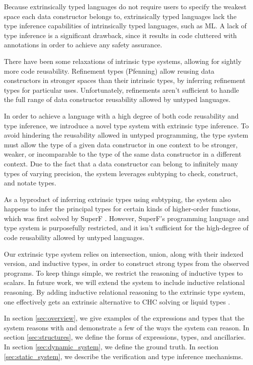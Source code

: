 \documentclass[acmsmall]{acmart}
\theoremstyle{definition}
\begin{document}
Because extrinsically typed languages do not require users to specify the weakest space each data constructor belongs to,
extrinsically typed languages lack the type inference capabilities of intrinsically typed languages, such as ML. 
A lack of type inference is a significant drawback, since it results in code cluttered with annotations in order
to achieve any safety assurance.

There have been some relaxations of intrinsic type systems, allowing for sightly more code reusability.
Refinement types (Pfenning) \cite{} allow reusing data constructors in stronger spaces than their intrinsic types, by
inferring refinement types for particular uses.
Unfortunately, refinements aren't sufficient to handle the full range of data constructor reusability allowed by untyped languages.

In order to achieve a language with a high degree of both code reusability and type inference, 
we introduce a novel type system with extrinsic type inference. 
To avoid hindering the reusability allowed in untyped programming, 
the type system must allow the type of a given data constructor in one context
to be stronger, weaker, or incomparable to the type of 
the same data constructor in a different context. 
Due to the fact that a data constructor can belong to infinitely many types of varying precision,
the system leverages subtyping to check, construct, and notate types.

As a byproduct of inferring extrinsic types using subtyping, the system also happens to infer the principal types for 
certain kinds of higher-order functions, which was first solved by SuperF \cite{}. 
However, SuperF's programming language and type system is purposefully 
restricted, and it isn't sufficient for the high-degree of code reusability allowed by untyped languages.

Our extrinsic type system relies on intersection, union, along with their indexed version, and inductive types, in order 
to construct strong types from the observed programs. 
To keep things simple, we restrict the reasoning of inductive types to scalars. In future work, 
we will extend the system to include inductive relational reasoning. By adding inductive relational
reasoning to the extrinsic type system, one effectively gets an extrinsic alternative to CHC solving \cite{} 
or liquid types \cite{}.


In section \ref{sec:overview}, we give examples of the expressions and types that the system reasons with
and demonstrate a few of the ways the system can reason. 
In section \ref{sec:structures}, we define the forms of expressions, types, and ancillaries. 
In section \ref{sec:dynamic_system}, we define the ground truth.
In section \ref{sec:static_system}, we describe the verification and type inference mechanisms.
\end{document}
